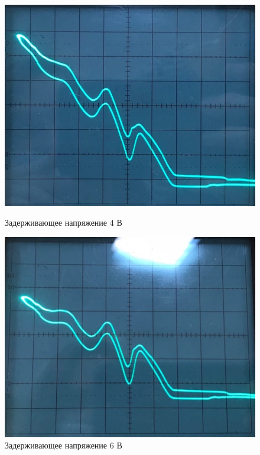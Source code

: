 \documentclass[a4paper]{article}
\begin{document}
\begin{enumerate}
	\begin{figure}[H]
		\begin{center}
		\begin{minipage}[h]{0.3\linewidth}
		\includegraphics[width=1\linewidth]{4.jpg}
		\caption{Задерживающее напряжение 4 В} 
		\label{4v}
		\end{minipage}
		\hfill 
		\begin{minipage}[h]{0.3\linewidth}
		\includegraphics[width=1\linewidth]{6.jpg}
		\caption{Задерживающее напряжение 6 В}
		\label{6v}
		\end{minipage}
		\hfill 
		\begin{minipage}[h]{0.3\linewidth}

\end{minipage}
\end{center}
\end{figure}
\end{enumerate}
\end{document}
